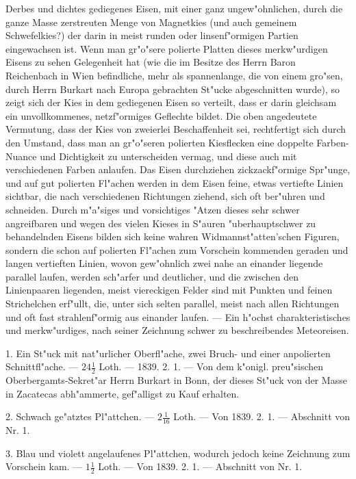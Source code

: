 \documentclass[a4paper, 11pt, oneside, polutonikogreek, german]{article}
\begin{document}
Derbes und dichtes gediegenes Eisen, mit einer ganz ungew"ohnlichen, durch die ganze Masse zerstreuten Menge von Magnetkies (und auch gemeinem Schwefelkies?) der darin in meist runden oder linsenf"ormigen Partien eingewachsen ist. Wenn man gr"o"sere polierte Platten dieses merkw"urdigen Eisens zu sehen Gelegenheit hat (wie die im Besitze des Herrn Baron Reichenbach in Wien befindliche, mehr als spannenlange, die von einem gro"sen, durch Herrn Burkart nach Europa gebrachten St"ucke abgeschnitten wurde), so zeigt sich der Kies in dem gediegenen Eisen so verteilt, dass er darin gleichsam ein unvollkommenes, netzf"ormiges Geflechte bildet. Die oben angedeutete Vermutung, dass der Kies von zweierlei Beschaffenheit sei, rechtfertigt sich durch den Umstand, dass man an gr"o"seren polierten Kiesflecken eine doppelte Farben-Nuance und Dichtigkeit zu unterscheiden vermag, und diese auch mit verschiedenen Farben anlaufen. Das Eisen durchziehen zickzackf"ormige Spr"unge, und auf gut polierten Fl"achen werden in dem Eisen feine, etwas vertiefte Linien sichtbar, die nach verschiedenen Richtungen ziehend, sich oft ber"uhren und schneiden. Durch m"a"siges und vorsichtiges "Atzen dieses sehr schwer angreifbaren und wegen des vielen Kieses in S"auren "uberhauptschwer zu behandelnden Eisens bilden sich keine wahren Widmannst"atten'schen Figuren, sondern die schon auf polierten Fl"achen zum Vorschein kommenden geraden und langen vertieften Linien, wovon gew"ohnlich zwei nahe an einander liegende parallel laufen, werden sch"arfer und deutlicher, und die zwischen den Linienpaaren liegenden, meist viereckigen Felder sind mit Punkten und feinen Strichelchen erf"ullt, die, unter sich selten parallel, meist nach allen Richtungen und oft fast strahlenf"ormig aus einander laufen. --- Ein h"ochst charakteristisches und merkw"urdiges, nach seiner Zeichnung schwer zu beschreibendes Meteoreisen.

1. Ein St"uck mit nat"urlicher Oberfl"ache, zwei Bruch- und einer anpolierten Schnittfl"ache. --- $\mathfrak{24\frac{1}{2}}$ Loth. --- 1839. 2. 1. --- Von dem k"onigl. preu"sischen Oberbergamts-Sekret"ar Herrn Burkart in Bonn, der dieses St"uck von der Masse in Zacatecas abh"ammerte, gef"alligst zu Kauf erhalten.

2. Schwach ge"atztes Pl"attchen. --- $\mathfrak{2\frac{1}{16}}$ Loth. --- Von 1839. 2. 1. --- Abschnitt von Nr. 1.

3. Blau und violett angelaufenes Pl"attchen, wodurch jedoch keine Zeichnung zum Vorschein kam. --- $\mathfrak{1\frac{1}{2}}$ Loth. --- Von 1839. 2. 1. --- Abschnitt von Nr. 1.
\end{document}
